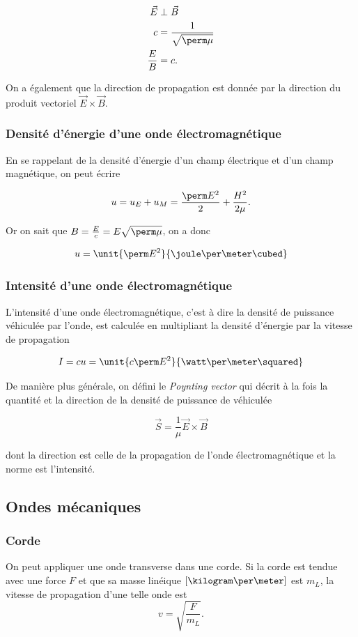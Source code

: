 \begin{align*}
  \vec{E} & \perp \vec{B}\\
  c & = \frac{1}{\sqrt{\perm\mu}}\\
  \frac{E}{B} & = c.
\end{align*}

On a également que la direction de propagation est donnée par
la direction du produit vectoriel $\vec{E} \times \vec{B}$.

\subsubsection{Densité d'énergie d'une onde électromagnétique}
En se rappelant de la densité d'énergie d'un champ électrique et 
d'un champ magnétique, on peut écrire

$$u = u_E + u_M = \frac{\perm E^2}{2} + \frac{H^2}{2\mu}.$$

Or on sait que $B = \frac{E}{c} = E\sqrt{\perm\mu}$, on a donc

$$u = \unit{\perm E^2}{\joule\per\meter\cubed}$$

\subsubsection{Intensité d'une onde électromagnétique}
L'intensité d'une onde électromagnétique, c'est à
dire la densité de puissance véhiculée par l'onde, est calculée
en multipliant la densité d'énergie par la vitesse de propagation

$$I = cu = \unit{c\perm E^2}{\watt\per\meter\squared}$$

De manière plus générale, on défini le \emph{Poynting vector}
qui décrit à la fois la quantité et la direction de la densité
de puissance de véhiculée

$$\vec{S} = \frac{1}{\mu} \vec{E} \times \vec{B}$$

dont la direction est celle de la propagation de l'onde électromagnétique
et la norme est l'intensité.

\subsection{Ondes mécaniques}

\subsubsection{Corde}
On peut appliquer une onde transverse dans une corde.
Si la corde est tendue avec une force $F$ et que
sa masse linéique $[\kilogram\per\meter]$ est $m_L$,
la vitesse de propagation d'une telle onde est
\[ v = \sqrt{\frac{F}{m_L}}. \]

